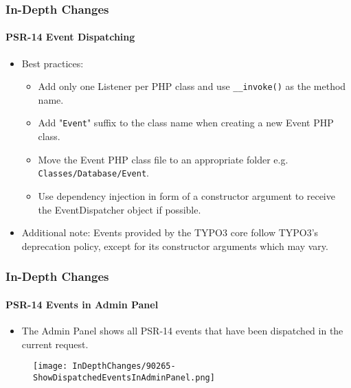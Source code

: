 
\begin{frame}[fragile]
	\frametitle{In-Depth Changes}
	\framesubtitle{PSR-14 Event Dispatching}

	\lstset{basicstyle=\tiny\ttfamily}

	\begin{itemize}
		\item Best practices:

			\begin{itemize}
				\item Add only one Listener per PHP class and use \texttt{\_\_invoke()} as the method name.
				\item Add "\texttt{Event}" suffix to the class name when creating a new Event PHP class.
				\item Move the Event PHP class file to an appropriate folder e.g. \texttt{Classes/Database/Event}.
				\item Use dependency injection in form of a constructor argument to receive the
					EventDispatcher object if possible.
			\end{itemize}

		\item Additional note:\newline
			\small
				Events provided by the TYPO3 core follow TYPO3's deprecation policy, except for its constructor
				arguments which may vary.
			\normalsize

	\end{itemize}

\end{frame}


\begin{frame}[fragile]
	\frametitle{In-Depth Changes}
	\framesubtitle{PSR-14 Events in Admin Panel}

	\begin{itemize}
		\item The Admin Panel shows all PSR-14 events that have been dispatched in the current request.
	\end{itemize}

	\begin{figure}
		\texttt{[image: InDepthChanges/90265-ShowDispatchedEventsInAdminPanel.png]}
	\end{figure}

\end{frame}

